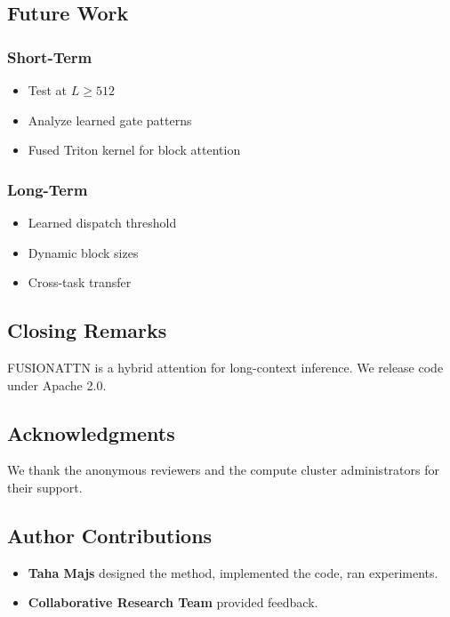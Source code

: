 \subsection{Future Work}

\subsubsection{Short-Term}
\begin{itemize}
\item Test at $L \geq 512$
\item Analyze learned gate patterns
\item Fused Triton kernel for block attention

\end{itemize}
\subsubsection{Long-Term}
\begin{itemize}
\item Learned dispatch threshold
\item Dynamic block sizes
\item Cross-task transfer

\end{itemize}
\subsection{Closing Remarks}

FUSIONATTN is a hybrid attention for long-context inference. We release 
code under Apache 2.0.

\subsection{Acknowledgments}

We thank the anonymous reviewers and the compute cluster administrators for their support.

\subsection{Author Contributions}

\begin{itemize}
\item \textbf{Taha Majs} designed the method, implemented the code, ran experiments.
\item \textbf{Collaborative Research Team} provided feedback.

\end{itemize}
